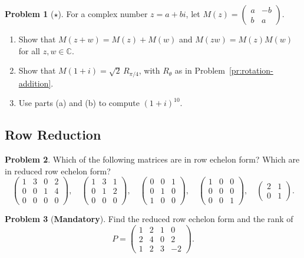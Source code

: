 \documentclass[11pt]{article}
\theoremstyle{definition}
\newtheorem{problem}{Problem}[section]
\newcommand{\mandatory}{\textcolor{red!70!black}{\textbf{Mandatory}}}
\begin{document}
\begin{problem}[$\star$]\label{pr:complex-matrix}
    For a complex number $z = a + bi$, let $M(z) = \begin{pmatrix} a & -b \\ b & a \end{pmatrix}$.
    \begin{enumerate}[label=(\alph*)]
        \item Show that $M(z + w) = M(z) + M(w)$ and $M(zw) = M(z) M(w)$ for all $z, w \in \mathbb{C}$.
        \item Show that $M(1 + i) = \sqrt{2}\, R_{\pi/4}$, with $R_\theta$ as in Problem~\ref{pr:rotation-addition}.
        \item Use parts (a) and (b) to compute $(1 + i)^{10}$.
    \end{enumerate}
\end{problem}

\subsection{Row Reduction}

\begin{problem}\label{pr:ref}
    Which of the following matrices are in row echelon form? Which are in reduced row echelon form?
    \[\begin{pmatrix} 1 & 3 & 0 & 2 \\ 0 & 0 & 1 & 4 \\ 0 & 0 & 0 & 0 \end{pmatrix}, \quad \begin{pmatrix} 1 & 3 & 1 \\ 0 & 1 & 2 \\ 0 & 0 & 0 \end{pmatrix}, \quad \begin{pmatrix} 0 & 0 & 1 \\ 0 & 1 & 0 \\ 1 & 0 & 0 \end{pmatrix}, \quad \begin{pmatrix} 1 & 0 & 0 \\ 0 & 0 & 0 \\ 0 & 0 & 1 \end{pmatrix}, \quad \begin{pmatrix} 2 & 1 \\ 0 & 1 \end{pmatrix}.\]
\end{problem}

\begin{problem}[\mandatory]\label{pr:rref-compute}
    Find the reduced row echelon form and the rank of
    \[P = \begin{pmatrix} 1 & 2 & 1 & 0 \\ 2 & 4 & 0 & 2 \\ 1 & 2 & 3 & -2 \end{pmatrix}.\]
\end{problem}
\end{document}
